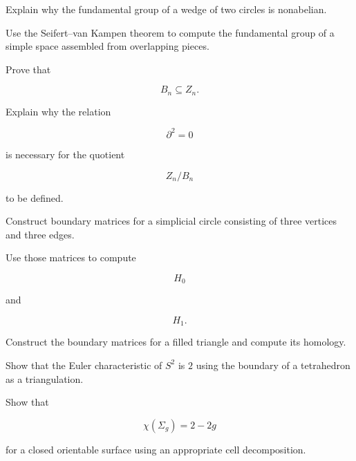 \begin{exercise}[3]
Explain why the fundamental group of a wedge of two circles is nonabelian.
\end{exercise}

\begin{exercise}[3]
Use the Seifert--van Kampen theorem to compute the fundamental group of a
simple space assembled from overlapping pieces.
\end{exercise}

\begin{exercise}[3]
Prove that

\[
B_n\subseteq Z_n.
\]
\end{exercise}

\begin{exercise}[3]
Explain why the relation

\[
\partial^2=0
\]

is necessary for the quotient

\[
Z_n/B_n
\]

to be defined.
\end{exercise}

\begin{exercise}[3]
Construct boundary matrices for a simplicial circle consisting of three
vertices and three edges.
\end{exercise}

\begin{exercise}[3]
Use those matrices to compute

\[
H_0
\]

and

\[
H_1.
\]
\end{exercise}

\begin{exercise}[3]
Construct the boundary matrices for a filled triangle and compute its
homology.
\end{exercise}

\begin{exercise}[3]
Show that the Euler characteristic of \(S^2\) is \(2\) using the boundary of
a tetrahedron as a triangulation.
\end{exercise}

\begin{exercise}[3]
Show that

\[
\chi(\Sigma_g)=2-2g
\]

for a closed orientable surface using an appropriate cell decomposition.
\end{exercise}

